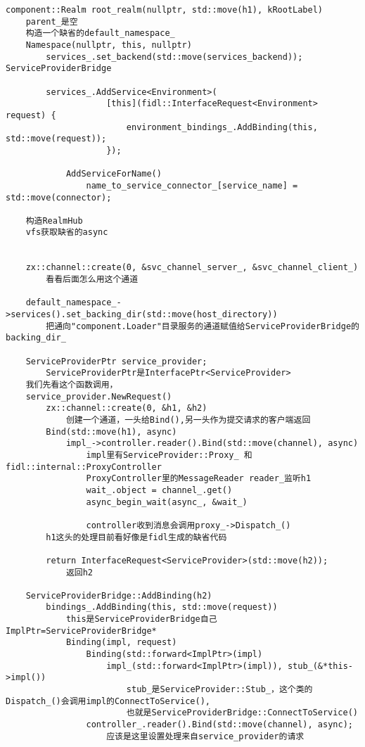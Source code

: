 \begin{verbatim}
component::Realm root_realm(nullptr, std::move(h1), kRootLabel)
    parent_是空
    构造一个缺省的default_namespace_
    Namespace(nullptr, this, nullptr)
        services_.set_backend(std::move(services_backend));   ServiceProviderBridge

        services_.AddService<Environment>(
                    [this](fidl::InterfaceRequest<Environment> request) {
                        environment_bindings_.AddBinding(this, std::move(request));
                    });

            AddServiceForName()
                name_to_service_connector_[service_name] = std::move(connector);

    构造RealmHub
    vfs获取缺省的async


    zx::channel::create(0, &svc_channel_server_, &svc_channel_client_)
        看看后面怎么用这个通道

    default_namespace_->services().set_backing_dir(std::move(host_directory))
        把通向"component.Loader"目录服务的通道赋值给ServiceProviderBridge的backing_dir_
      
    ServiceProviderPtr service_provider;
        ServiceProviderPtr是InterfacePtr<ServiceProvider>
    我们先看这个函数调用，
    service_provider.NewRequest()
        zx::channel::create(0, &h1, &h2)
            创建一个通道，一头给Bind(),另一头作为提交请求的客户端返回
        Bind(std::move(h1), async) 
            impl_->controller.reader().Bind(std::move(channel), async)
                impl里有ServiceProvider::Proxy_ 和  fidl::internal::ProxyController
                ProxyController里的MessageReader reader_监听h1
                wait_.object = channel_.get()
                async_begin_wait(async_, &wait_)

                controller收到消息会调用proxy_->Dispatch_()
        h1这头的处理目前看好像是fidl生成的缺省代码
        
        return InterfaceRequest<ServiceProvider>(std::move(h2));
            返回h2

    ServiceProviderBridge::AddBinding(h2)
        bindings_.AddBinding(this, std::move(request))
            this是ServiceProviderBridge自己 ImplPtr=ServiceProviderBridge*
            Binding(impl, request)
                Binding(std::forward<ImplPtr>(impl)
                    impl_(std::forward<ImplPtr>(impl)), stub_(&*this->impl())
                        stub_是ServiceProvider::Stub_，这个类的Dispatch_()会调用impl的ConnectToService(),
                        也就是ServiceProviderBridge::ConnectToService()
                controller_.reader().Bind(std::move(channel), async);
                    应该是这里设置处理来自service_provider的请求
            

\end{verbatim}
